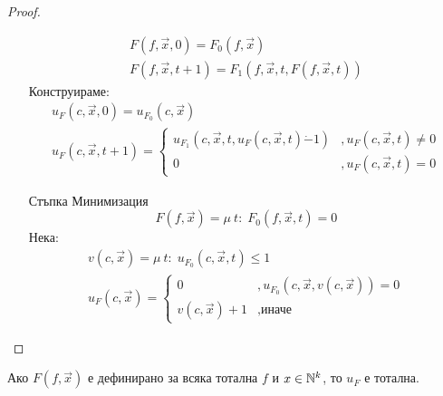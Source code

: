 \begin{proof}
\begin{itemize}
\begin{equation}
            \begin{split}
                F(f, \overrightarrow{x}, 0) = F_0(f, \overrightarrow{x}) \\
                F(f, \overrightarrow{x}, t+1) = F_1(f, \overrightarrow{x}, t, F(f, \overrightarrow{x}, t))
            \end{split}
        \end{equation}
        Конструираме:
        \begin{equation}
            \begin{split}
                u_F(c, \overrightarrow{x}, 0) = u_{F_0}(c, \overrightarrow{x}) \\
                u_F(c, \overrightarrow{x}, t+1) = \begin{cases}
                    u_{F_1}(c, \overrightarrow{x}, t, u_F(c, \overrightarrow{x}, t) \dot - 1) &, u_F(c, \overrightarrow{x}, t)\neq 0 \\
                    0 &, u_F(c, \overrightarrow{x}, t) = 0 
                \end{cases}
            \end{split}
        \end{equation}
        \item[Стъпка] Минимизация
        \begin{equation}
            F(f, \overrightarrow{x}) = \mu\ t:\; F_0(f, \overrightarrow{x}, t) = 0
        \end{equation}
        Нека:
        \begin{equation}
            \begin{split}
                v(c, \overrightarrow{x}) = \mu\ t:\; u_{F_0}(c, \overrightarrow{x}, t) \leq 1 \\
                u_F(c, \overrightarrow{x}) = \begin{cases}
                    0 &, u_{F_0}(c, \overrightarrow{x}, v(c, \overrightarrow{x})) = 0 \\
                    v(c, \overrightarrow{x}) + 1 &, \text{иначе}
                \end{cases}
            \end{split}
        \end{equation}
    \end{itemize}
\end{proof}
\begin{corollary}
    Ако $F(f, \overrightarrow{x})$ е дефинирано за всяка тотална $f$ и $x \in {\mathbb{N}}^k$, то $u_F$ е тотална.
\end{corollary}

